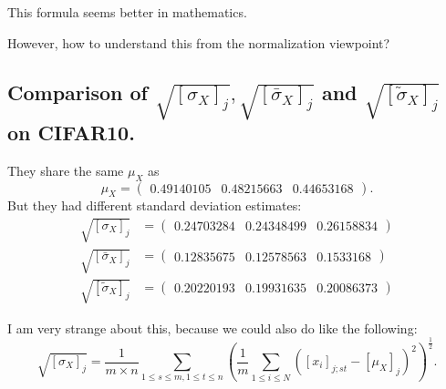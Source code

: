 This formula seems better in mathematics.

However, how to understand this from the normalization viewpoint? 





\subsection{Comparison of $\sqrt{[\sigma_X]_j}, \sqrt{[\bar \sigma_X]_j}$ and  $\sqrt{[\tilde \sigma_X]_j}$ on CIFAR10.}

They share the same $\mu_X$ as
\begin{equation}\label{key}
\mu_X = \begin{pmatrix}
0.49140105 & 0.48215663 & 0.44653168
\end{pmatrix}.
\end{equation}
But they had different standard deviation estimates:
\begin{equation}
\begin{aligned}
\sqrt{[\sigma_X]_j} &= \begin{pmatrix}
0.24703284 & 0.24348499 & 0.26158834
\end{pmatrix} \\
\sqrt{[\bar \sigma_X]_j} &= \begin{pmatrix}
0.12835675 & 0.12578563 & 0.1533168
\end{pmatrix} \\
\sqrt{[\tilde \sigma_X]_j} &= \begin{pmatrix}
0.20220193 & 0.19931635 & 0.20086373
\end{pmatrix} 
\end{aligned}
\end{equation}

I am very strange about this, because we could also do like the following:
\begin{equation}\label{key}
\sqrt{[\sigma_X]_j} = \frac{1}{ m\times n} \sum_{1\le s \le m, 1 \le t \le n} \left( \frac{1}{m} \sum_{ 1 \le i \le N}  ([x_i]_{j;st} -[\mu_X]_j )^2 \right)^{\frac{1}{2}}.
\end{equation}


